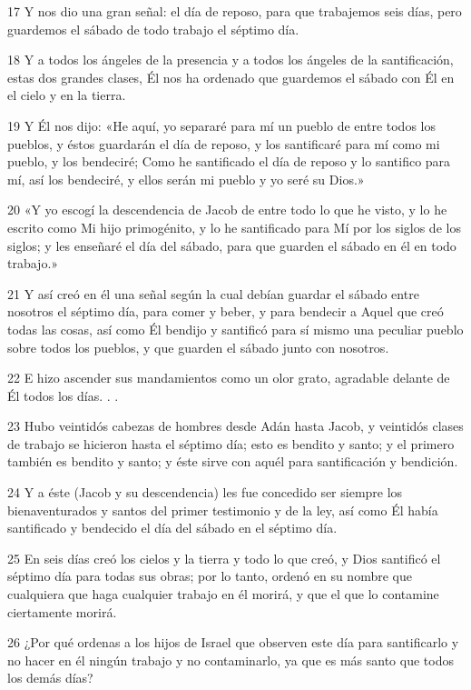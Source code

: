 \par 17 Y nos dio una gran señal: el día de reposo, para que trabajemos seis días, pero guardemos el sábado de todo trabajo el séptimo día.
\par 18 Y a todos los ángeles de la presencia y a todos los ángeles de la santificación, estas dos grandes clases, Él nos ha ordenado que guardemos el sábado con Él en el cielo y en la tierra.
\par 19 Y Él nos dijo: «He aquí, yo separaré para mí un pueblo de entre todos los pueblos, y éstos guardarán el día de reposo, y los santificaré para mí como mi pueblo, y los bendeciré; Como he santificado el día de reposo y lo santifico para mí, así los bendeciré, y ellos serán mi pueblo y yo seré su Dios.»
\par 20 «Y yo escogí la descendencia de Jacob de entre todo lo que he visto, y lo he escrito como Mi hijo primogénito, y lo he santificado para Mí por los siglos de los siglos; y les enseñaré el día del sábado, para que guarden el sábado en él en todo trabajo.»
\par 21 Y así creó en él una señal según la cual debían guardar el sábado entre nosotros el séptimo día, para comer y beber, y para bendecir a Aquel que creó todas las cosas, así como Él bendijo y santificó para sí mismo una peculiar pueblo sobre todos los pueblos, y que guarden el sábado junto con nosotros.
\par 22 E hizo ascender sus mandamientos como un olor grato, agradable delante de Él todos los días. . .
\par 23 Hubo veintidós cabezas de hombres desde Adán hasta Jacob, y veintidós clases de trabajo se hicieron hasta el séptimo día; esto es bendito y santo; y el primero también es bendito y santo; y éste sirve con aquél para santificación y bendición.
\par 24 Y a éste (Jacob y su descendencia) les fue concedido ser siempre los bienaventurados y santos del primer testimonio y de la ley, así como Él había santificado y bendecido el día del sábado en el séptimo día.
\par 25 En seis días creó los cielos y la tierra y todo lo que creó, y Dios santificó el séptimo día para todas sus obras; por lo tanto, ordenó en su nombre que cualquiera que haga cualquier trabajo en él morirá, y que el que lo contamine ciertamente morirá.
\par 26 ¿Por qué ordenas a los hijos de Israel que observen este día para santificarlo y no hacer en él ningún trabajo y no contaminarlo, ya que es más santo que todos los demás días?
